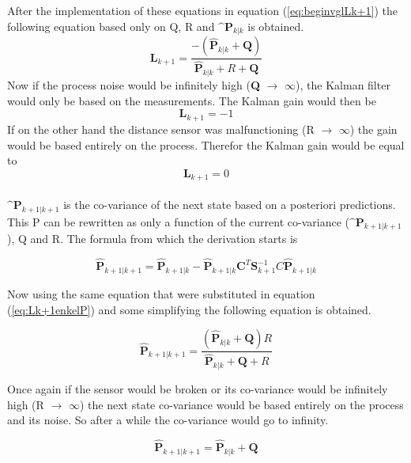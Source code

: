 After the implementation of these equations in equation (\ref{eq:beginvglLk+1}) the following equation based only on Q, R and $\^{\textbf{P}}_{k|k}$ is obtained.
\begin{equation}
\label{eq:Lk+1enkelP}
    \textbf{L}_{k+1} = \frac{-(\hat{\textbf{P}}_{k|k}+\textbf{Q})}{\hat{\textbf{P}}_{k|k}+R + \textbf{Q}}
\end{equation}
Now if the process noise would be infinitely high (\textbf{Q} $\rightarrow$ $\infty$), the Kalman filter would only be based on the measurements. The Kalman gain would then be
\begin{equation}
    \label{eq:LQinf}
    \textbf{L}_{k+1} = -1
\end{equation}
If on the other hand the distance sensor was malfunctioning (R $\rightarrow$ $\infty$) the gain would be based entirely on the process. Therefor the Kalman gain would be equal to
\begin{equation}
    \label{eq:LRinf}
    \textbf{L}_{k+1} = 0
\end{equation}
\\
$\^{\textbf{P}}_{k+1|k+1}$ is the co-variance of the next state based on a posteriori predictions. This P can be rewritten as only a function of the current co-variance ($\^{\textbf{P}}_{k+1|k+1}$), Q and R. The formula from which the derivation starts is

\begin{equation}
    \hat{\textbf{P}}_{k+1|k+1} = \hat{\textbf{P}}_{k+1|k} - \hat{\textbf{P}}_{k+1|k}\textbf{C}^{T}\textbf{S}_{k+1}^{-1}C\hat{\textbf{P}}_{k+1|k}
\end{equation}

Now using the same equation that were substituted in equation (\ref{eq:Lk+1enkelP}) and some simplifying the following equation is obtained.

\begin{equation}
    \hat{\textbf{P}}_{k+1|k+1} = \frac{(\hat{\textbf{P}}_{k|k}+\textbf{Q})R}{\hat{\textbf{P}}_{k|k}+\textbf{Q}+R}
\end{equation}

Once again if the sensor would be broken or its co-variance would be infinitely high (R $\rightarrow$ $\infty$) the next state co-variance would be based entirely on the process and its noise. So after a while the co-variance would go to infinity. 

\begin{equation}
    \label{eq:Pk+1k+1}
    \hat{\textbf{P}}_{k+1|k+1} = \hat{\textbf{P}}_{k|k} + \textbf{Q}
\end{equation}

